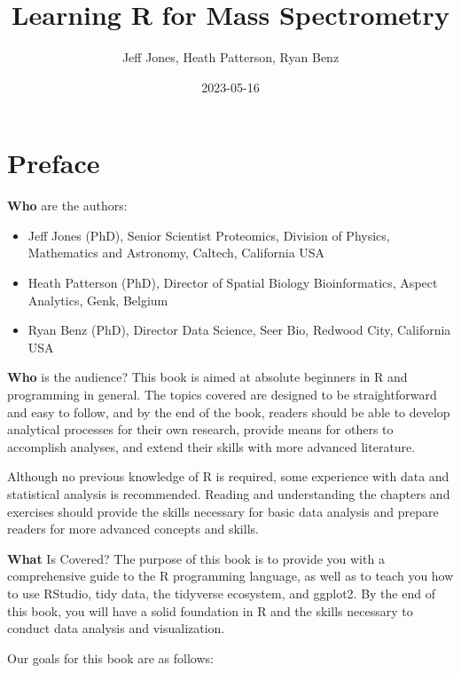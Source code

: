 \documentclass[
]{book}
\title{Learning R for Mass Spectrometry}
\author{Jeff Jones, Heath Patterson, Ryan Benz}
\date{2023-05-16}
\begin{document}
\maketitle

{
\setcounter{tocdepth}{1}
\tableofcontents
}
\hypertarget{preface}{%
\chapter*{Preface}\label{preface}}

\textbf{Who} are the authors:

\begin{itemize}
\item
  Jeff Jones (PhD), Senior Scientist Proteomics, Division of Physics, Mathematics and Astronomy, Caltech, California USA
\item
  Heath Patterson (PhD), Director of Spatial Biology Bioinformatics, Aspect Analytics, Genk, Belgium
\item
  Ryan Benz (PhD), Director Data Science, Seer Bio, Redwood City, California USA
\end{itemize}

\textbf{Who} is the audience? This book is aimed at absolute beginners in R and programming in general. The topics covered are designed to be straightforward and easy to follow, and by the end of the book, readers should be able to develop analytical processes for their own research, provide means for others to accomplish analyses, and extend their skills with more advanced literature.

Although no previous knowledge of R is required, some experience with data and statistical analysis is recommended. Reading and understanding the chapters and exercises should provide the skills necessary for basic data analysis and prepare readers for more advanced concepts and skills.

\textbf{What} Is Covered? The purpose of this book is to provide you with a comprehensive guide to the R programming language, as well as to teach you how to use RStudio, tidy data, the tidyverse ecosystem, and ggplot2. By the end of this book, you will have a solid foundation in R and the skills necessary to conduct data analysis and visualization.

Our goals for this book are as follows:
\end{document}
